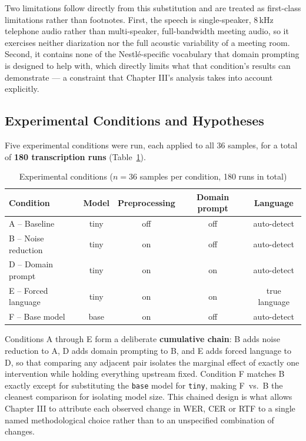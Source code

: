 \documentclass[12pt]{report}
\begin{document}
Two limitations follow directly from this substitution and are treated as first-class limitations rather than footnotes. First, the speech is single-speaker, 8\,kHz telephone audio rather than multi-speaker, full-bandwidth meeting audio, so it exercises neither diarization nor the full acoustic variability of a meeting room. Second, it contains none of the Nestl\'e-specific vocabulary that domain prompting is designed to help with, which directly limits what that condition's results can demonstrate --- a constraint that Chapter III's analysis takes into account explicitly.

\subsection{Experimental Conditions and Hypotheses}

Five experimental conditions were run, each applied to all 36 samples, for a total of \textbf{180 transcription runs} (Table~\ref{tab:conditions}).

\begin{table}[H]
\centering
\small
\begin{tabular}{|l|c|c|c|c|}
\hline
\textbf{Condition} & \textbf{Model} & \textbf{Preprocessing} & \textbf{Domain prompt} & \textbf{Language} \\ \hline
A -- Baseline & tiny & off & off & auto-detect \\ \hline
B -- Noise reduction & tiny & on & off & auto-detect \\ \hline
D -- Domain prompt & tiny & on & on & auto-detect \\ \hline
E -- Forced language & tiny & on & on & true language \\ \hline
F -- Base model & base & on & off & auto-detect \\ \hline
\end{tabular}
\caption{Experimental conditions ($n=36$ samples per condition, 180 runs in total)}
\label{tab:conditions}
\end{table}

Conditions A through E form a deliberate \textbf{cumulative chain}: B adds noise reduction to A, D adds domain prompting to B, and E adds forced language to D, so that comparing any adjacent pair isolates the marginal effect of exactly one intervention while holding everything upstream fixed. Condition F matches B exactly except for substituting the \texttt{base} model for \texttt{tiny}, making F~vs.~B the cleanest comparison for isolating model size. This chained design is what allows Chapter III to attribute each observed change in WER, CER or RTF to a single named methodological choice rather than to an unspecified combination of changes.
\end{document}
